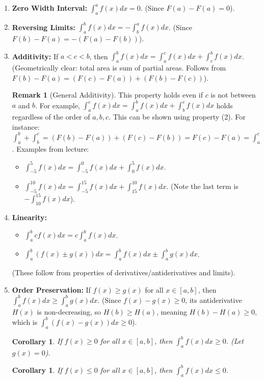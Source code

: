 \documentclass[11pt]{article}
\newtheorem{corollary}[theorem]{Corollary}
\theoremstyle{definition}
\newtheorem{remark}[theorem]{Remark}
\theoremstyle{remark} %
\begin{document}
\begin{enumerate}
    \item \textbf{Zero Width Interval:} $\displaystyle \int_a^a f(x) dx = 0$.
        (Since $F(a) - F(a) = 0$).

    \item \textbf{Reversing Limits:} $\displaystyle \int_a^b f(x) dx = - \int_b^a f(x) dx$.
        (Since $F(b) - F(a) = -(F(a) - F(b))$).

    \item \textbf{Additivity:} If $a < c < b$, then $\displaystyle \int_a^b f(x) dx = \int_a^c f(x) dx + \int_c^b f(x) dx$.
        (Geometrically clear: total area is sum of partial areas. Follows from $F(b)-F(a) = (F(c)-F(a)) + (F(b)-F(c))$).
        \begin{remark}[General Additivity]
            This property holds even if $c$ is not between $a$ and $b$. For example, $\int_a^c f(x) dx = \int_a^b f(x) dx + \int_b^c f(x) dx$ holds regardless of the order of $a, b, c$. This can be shown using property (2). For instance:
            $\int_a^b + \int_b^c = (F(b)-F(a)) + (F(c)-F(b)) = F(c)-F(a) = \int_a^c$.
            Examples from lecture:
            \begin{itemize}
                \item $\int_{-5}^5 f(x) dx = \int_{-5}^0 f(x) dx + \int_0^5 f(x) dx$.
                \item $\int_{-5}^{10} f(x) dx = \int_{-5}^{15} f(x) dx + \int_{15}^{10} f(x) dx$. (Note the last term is $-\int_{10}^{15} f(x) dx$).
            \end{itemize}
        \end{remark}

    \item \textbf{Linearity:}
        \begin{itemize}
            \item $\displaystyle \int_a^b c f(x) dx = c \int_a^b f(x) dx$.
            \item $\displaystyle \int_a^b (f(x) \pm g(x)) dx = \int_a^b f(x) dx \pm \int_a^b g(x) dx$.
        \end{itemize}
        (These follow from properties of derivatives/antiderivatives and limits).

    \item \textbf{Order Preservation:} If $f(x) \ge g(x)$ for all $x \in [a, b]$, then $\displaystyle \int_a^b f(x) dx \ge \int_a^b g(x) dx$.
        (Since $f(x)-g(x) \ge 0$, its antiderivative $H(x)$ is non-decreasing, so $H(b) \ge H(a)$, meaning $H(b)-H(a) \ge 0$, which is $\int_a^b (f(x)-g(x)) dx \ge 0$).
        \begin{corollary}
            If $f(x) \ge 0$ for all $x \in [a, b]$, then $\displaystyle \int_a^b f(x) dx \ge 0$. (Let $g(x)=0$).
        \end{corollary}
        \begin{corollary}
            If $f(x) \le 0$ for all $x \in [a, b]$, then $\displaystyle \int_a^b f(x) dx \le 0$.
        \end{corollary}


\end{enumerate}
\end{document}
